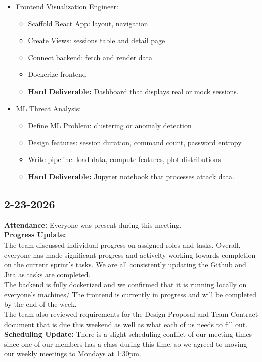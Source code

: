 \documentclass{article}
\begin{document}
\begin{itemize}
\begin{itemize}
        \item Implement SQL init script 
        \item Connect backend to accept inserts and test queries
        \item Write sample analytic queries
        \item \textbf{Hard Deliverable:} Postgres with real tables storing attack data.
    \end{itemize}
    \item Frontend Visualization Engineer: 
    \begin{itemize}
        \item Scaffold React App: layout, navigation
        \item Create Views: sessions table and detail page
        \item Connect backend: fetch and render data
        \item Dockerize frontend
        \item \textbf{Hard Deliverable:} Dashboard that displays real or mock sessions.
    \end{itemize}
    \item ML Threat Analysis:
    \begin{itemize}
        \item Define ML Problem: clustering or anomaly detection
        \item Design features: session duration, command count, password entropy
        \item Write pipeline: load data, compute features, plot distributions
        \item \textbf{Hard Deliverable:} Jupyter notebook that processes attack data.
    \end{itemize}
\end{itemize}

\subsection{2-23-2026}
\textbf{Attendance:} Everyone was present during this meeting. 
\\\textbf{Progress Update:}
\\The team discussed individual progress on assigned roles and tasks. Overall, everyone has made significant progress and activelty working towards completion on the current sprint's tasks. We are all consistently updating the Github and Jira as tasks are completed.
\\The backend is fully dockerized and we confirmed that it is running locally on everyone's machines/ The frontend is currently in progress and will be completed by the end of the week. 
\\The team also reviewed requirements for the Design Proposal and Team Contract document that is due this weekend as well as what each of us needs to fill out. 
\\\textbf{Scheduling Update:}
There is a slight scheduling conflict of our meeting times since one of our members has a class during this time, so we agreed to moving our weekly meetings to Mondays at 1:30pm. 
\end{document}
